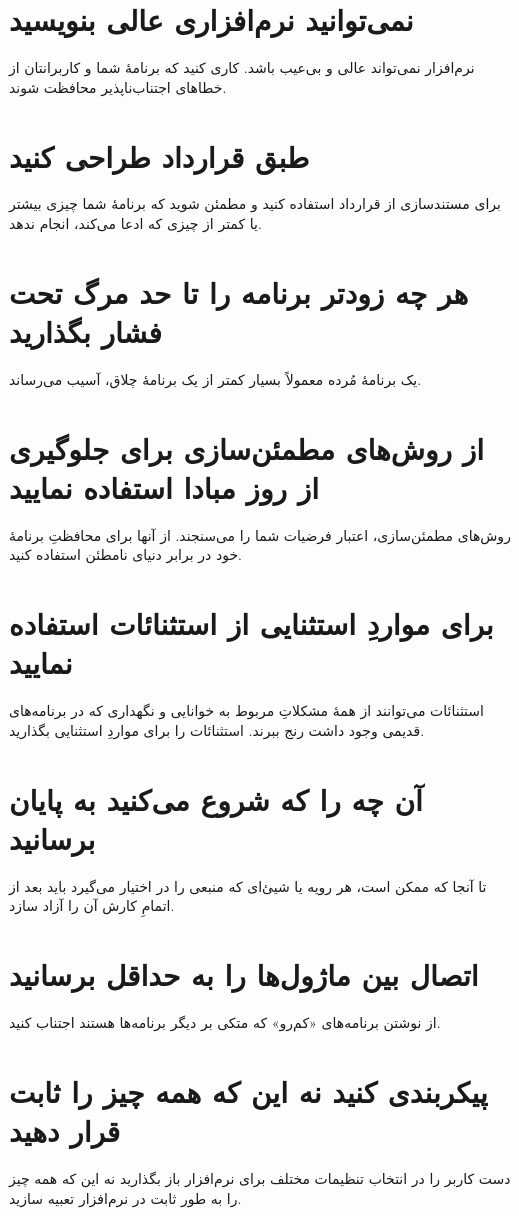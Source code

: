 \documentclass[10pt, a4paper]{book}
\begin{document}
    \section{نمی‌توانید نرم‌افزاری عالی بنویسید}
    نرم‌افزار نمی‌تواند عالی و بی‌عیب باشد. کاری کنید که برنامهٔ شما و کاربرانتان از خطاهای اجتناب‌ناپذیر محافظت شوند.

    \section{طبق قرارداد طراحی کنید}
    برای مستندسازی از قرارداد استفاده کنید و مطمئن شوید که برنامهٔ شما چیزی بیشتر یا کمتر از چیزی که ادعا می‌کند، انجام ندهد.

    \section{هر چه زودتر برنامه را تا حد مرگ تحت فشار بگذارید}
    یک برنامهٔ مُرده معمولاً بسیار کمتر از یک برنامهٔ چلاق، آسیب می‌رساند.

    \section{از روش‌های مطمئن‌سازی برای جلوگیری از روز مبادا استفاده نمایید}
    روش‌های مطمئن‌سازی، اعتبار فرضیات شما را می‌سنجند. از آنها برای محافظتِ برنامهٔ خود در برابر دنیای نامطئن استفاده کنید.

    \section{برای مواردِ استثنایی از استثنائات استفاده نمایید}
    استثنائات می‌توانند از همهٔ مشکلاتِ مربوط به خوانایی و نگهداری که در برنامه‌های قدیمی وجود داشت رنج ببرند. استثنائات را برای مواردِ استثنایی بگذارید.
    
    \section{آن چه را که شروع می‌کنید به پایان برسانید}
    تا آنجا که ممکن است، هر رویه یا شیئ‌ای که منبعی را در اختیار می‌گیرد باید بعد از اتمامِ کارش آن را آزاد سازد.

    \section{اتصال بین ماژول‌ها را به حداقل برسانید}
    از نوشتن برنامه‌های «کم‌رو» که متکی بر دیگر برنامه‌ها هستند اجتناب کنید.

    \section{پیکربندی کنید نه این که همه چیز را ثابت قرار دهید}
    دست کاربر را در انتخاب تنظیمات مختلف برای نرم‌افزار باز بگذارید نه این که همه چیز را به طور ثابت در نرم‌افزار تعبیه سازید.
\end{document}
